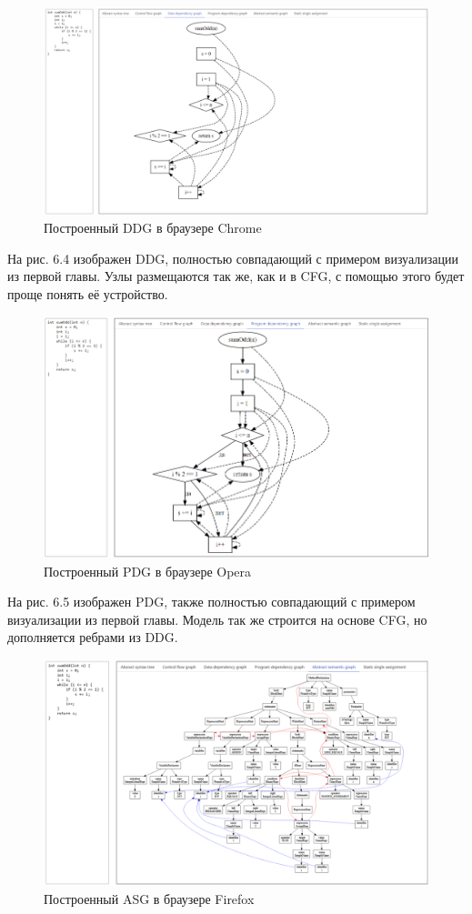 \begin{figure}[h]
	\center
	\includegraphics [scale=0.48] {my_folder/images/my/23}
	\caption{Построенный DDG в браузере Chrome}
	\label{fig:23}
\end{figure}
На рис. 6.4 изображен DDG, полностью совпадающий с примером визуализации из первой главы. Узлы размещаются так же, как и в CFG, с помощью этого будет проще понять её устройство.
\begin{figure}[h]
	\center
	\includegraphics [scale=0.65] {my_folder/images/my/24}
	\caption{Построенный PDG в браузере Opera}
	\label{fig:24}
\end{figure}
\newpage
На рис. 6.5 изображен PDG, также полностью совпадающий с примером визуализации из первой главы. Модель так же строится на основе CFG, но дополняется ребрами из DDG.
\begin{figure}[h]
	\center
	\includegraphics [scale=0.55] {my_folder/images/my/25}
	\caption{Построенный ASG в браузере Firefox}
	\label{fig:25}
\end{figure}

